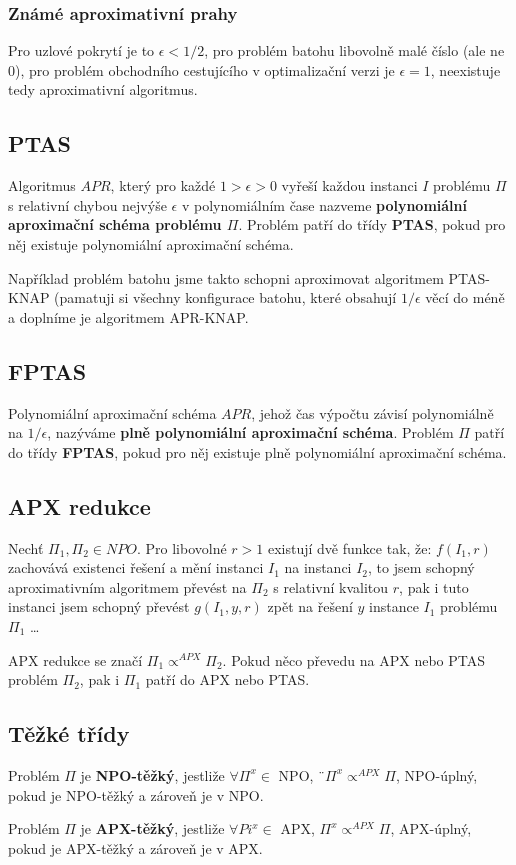 \subsubsection{Známé aproximativní prahy}

Pro uzlové pokrytí je to $\epsilon < 1/2$, pro problém batohu libovolně malé číslo (ale ne 0), pro problém obchodního cestujícího v optimalizační verzi je $\epsilon = 1$, neexistuje tedy aproximativní algoritmus.

\subsection{PTAS}

Algoritmus $APR$, který pro každé $1>\epsilon>0$ vyřeší každou instanci $I$ problému $\Pi$ s relativní chybou nejvýše $\epsilon$ v polynomiálním čase nazveme \textbf{polynomiální aproximační schéma problému $\Pi$}. Problém patří do třídy \textbf{PTAS}, pokud pro něj existuje polynomiální aproximační schéma.

\vspace{4pt}
\noindent Například problém batohu jsme takto schopni aproximovat algoritmem PTAS-KNAP (pamatuji si všechny konfigurace batohu, které obsahují $1/\epsilon$ věcí do méně a doplníme je algoritmem APR-KNAP.

\subsection{FPTAS}

Polynomiální aproximační schéma $APR$, jehož čas výpočtu závisí polynomiálně na $1/\epsilon$, nazýváme \textbf{plně polynomiální aproximační schéma}. Problém $\Pi$ patří do třídy \textbf{FPTAS}, pokud pro něj existuje plně polynomiální aproximační schéma.

\subsection{APX redukce}

Nechť $\Pi_1, \Pi_2 \in NPO$. Pro libovolné $r > 1$ existují dvě funkce tak, že: $f(I_1, r)$ zachovává existenci řešení a mění instanci $I_1$ na instanci $I_2$, to jsem schopný aproximativním algoritmem převést na $\Pi_2$ s relativní kvalitou $r$, pak i tuto instanci jsem schopný převést $g(I_1,y,r)$ zpět na řešení $y$ instance $I_1$ problému $\Pi_1$ \ldots

\vspace{4pt}
\noindent APX redukce se značí $\Pi_1 \propto^{APX} \Pi_2$. Pokud něco převedu na APX nebo PTAS problém $\Pi_2$, pak i $\Pi_1$ patří do APX nebo PTAS.

\subsection{Těžké třídy}

Problém $\Pi$ je \textbf{NPO-těžký}, jestliže $\forall \Pi^x \in $ NPO, ¨$ \Pi^x \propto^{APX} \Pi$, NPO-úplný, pokud je NPO-těžký a zároveň je v NPO.

\vspace{4pt}
\noindent Problém $\Pi$ je \textbf{APX-těžký}, jestliže $\forall Pi^x \in $ APX, $\Pi^x \propto^{APX} \Pi$, APX-úplný, pokud je APX-těžký a zároveň je v APX.
